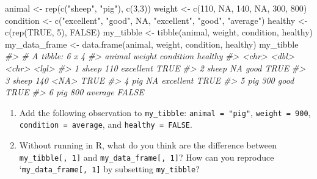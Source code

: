 \documentclass[
]{book}
\newenvironment{Shaded}{\begin{snugshade}}{\end{snugshade}}
\newcommand{\CommentTok}[1]{\textcolor[rgb]{0.56,0.35,0.01}{\textit{#1}}}
\newcommand{\ConstantTok}[1]{\textcolor[rgb]{0.00,0.00,0.00}{#1}}
\newcommand{\DecValTok}[1]{\textcolor[rgb]{0.00,0.00,0.81}{#1}}
\newcommand{\FunctionTok}[1]{\textcolor[rgb]{0.00,0.00,0.00}{#1}}
\newcommand{\NormalTok}[1]{#1}
\newcommand{\OtherTok}[1]{\textcolor[rgb]{0.56,0.35,0.01}{#1}}
\newcommand{\StringTok}[1]{\textcolor[rgb]{0.31,0.60,0.02}{#1}}
\providecommand{\tightlist}{%
  \setlength{\itemsep}{0pt}\setlength{\parskip}{0pt}}
\begin{document}
\begin{Shaded}
\begin{Highlighting}[]
\NormalTok{animal }\OtherTok{\textless{}{-}} \FunctionTok{rep}\NormalTok{(}\FunctionTok{c}\NormalTok{(}\StringTok{"sheep"}\NormalTok{, }\StringTok{"pig"}\NormalTok{), }\FunctionTok{c}\NormalTok{(}\DecValTok{3}\NormalTok{,}\DecValTok{3}\NormalTok{))}
\NormalTok{weight }\OtherTok{\textless{}{-}} \FunctionTok{c}\NormalTok{(}\DecValTok{110}\NormalTok{, }\ConstantTok{NA}\NormalTok{, }\DecValTok{140}\NormalTok{, }\ConstantTok{NA}\NormalTok{, }\DecValTok{300}\NormalTok{, }\DecValTok{800}\NormalTok{)}
\NormalTok{condition }\OtherTok{\textless{}{-}} \FunctionTok{c}\NormalTok{(}\StringTok{"excellent"}\NormalTok{, }\StringTok{"good"}\NormalTok{, }\ConstantTok{NA}\NormalTok{, }\StringTok{"excellent"}\NormalTok{, }\StringTok{"good"}\NormalTok{, }\StringTok{"average"}\NormalTok{)}
\NormalTok{healthy }\OtherTok{\textless{}{-}} \FunctionTok{c}\NormalTok{(}\FunctionTok{rep}\NormalTok{(}\ConstantTok{TRUE}\NormalTok{, }\DecValTok{5}\NormalTok{), }\ConstantTok{FALSE}\NormalTok{)}
\NormalTok{my\_tibble }\OtherTok{\textless{}{-}} \FunctionTok{tibble}\NormalTok{(animal, weight, condition, healthy)}
\NormalTok{my\_data\_frame }\OtherTok{\textless{}{-}} \FunctionTok{data.frame}\NormalTok{(animal, weight, condition, healthy)}
\NormalTok{my\_tibble}
\CommentTok{\#\textgreater{} \# A tibble: 6 x 4}
\CommentTok{\#\textgreater{}   animal weight condition healthy}
\CommentTok{\#\textgreater{}   \textless{}chr\textgreater{}   \textless{}dbl\textgreater{} \textless{}chr\textgreater{}     \textless{}lgl\textgreater{}  }
\CommentTok{\#\textgreater{} 1 sheep     110 excellent TRUE   }
\CommentTok{\#\textgreater{} 2 sheep      NA good      TRUE   }
\CommentTok{\#\textgreater{} 3 sheep     140 \textless{}NA\textgreater{}      TRUE   }
\CommentTok{\#\textgreater{} 4 pig        NA excellent TRUE   }
\CommentTok{\#\textgreater{} 5 pig       300 good      TRUE   }
\CommentTok{\#\textgreater{} 6 pig       800 average   FALSE}
\end{Highlighting}
\end{Shaded}

\begin{enumerate}
\def\labelenumi{\arabic{enumi}.}
\tightlist
\item
  Add the following observation to \texttt{my\_tibble}: \texttt{animal\ =\ "pig"}, \texttt{weight\ =\ 900}, \texttt{condition\ =\ average}, and \texttt{healthy\ =\ FALSE}.
\item
  Without running in R, what do you think are the difference between \texttt{my\_tibble{[},\ 1{]}} and \texttt{my\_data\_frame{[},\ 1{]}}? How can you reproduce `\texttt{my\_data\_frame{[},\ 1{]}} by subsetting \texttt{my\_tibble}?
\end{enumerate}
\end{document}
